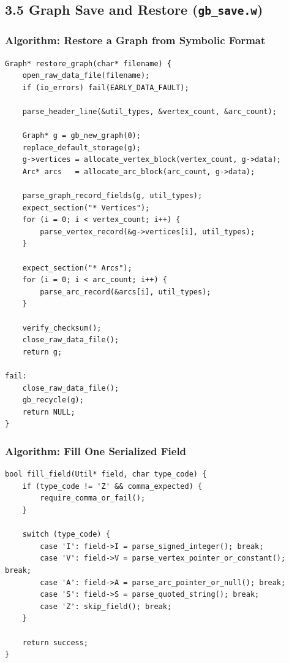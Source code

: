 \documentclass[11pt]{article}
\begin{document}
\subsection{\texorpdfstring{3.5 Graph Save and Restore (\texttt{gb\_save.w})}{3.5 Graph Save and Restore (gb\_save.w)}}\label{graph-save-and-restore-gb_save.w}

\subsubsection{Algorithm: Restore a Graph from Symbolic Format}\label{algorithm-restore-a-graph-from-symbolic-format}

\begin{verbatim}
Graph* restore_graph(char* filename) {
    open_raw_data_file(filename);
    if (io_errors) fail(EARLY_DATA_FAULT);

    parse_header_line(&util_types, &vertex_count, &arc_count);

    Graph* g = gb_new_graph(0);
    replace_default_storage(g);
    g->vertices = allocate_vertex_block(vertex_count, g->data);
    Arc* arcs   = allocate_arc_block(arc_count, g->data);

    parse_graph_record_fields(g, util_types);
    expect_section("* Vertices");
    for (i = 0; i < vertex_count; i++) {
        parse_vertex_record(&g->vertices[i], util_types);
    }

    expect_section("* Arcs");
    for (i = 0; i < arc_count; i++) {
        parse_arc_record(&arcs[i], util_types);
    }

    verify_checksum();
    close_raw_data_file();
    return g;

fail:
    close_raw_data_file();
    gb_recycle(g);
    return NULL;
}
\end{verbatim}

\subsubsection{Algorithm: Fill One Serialized Field}\label{algorithm-fill-one-serialized-field}

\begin{verbatim}
bool fill_field(Util* field, char type_code) {
    if (type_code != 'Z' && comma_expected) {
        require_comma_or_fail();
    }

    switch (type_code) {
        case 'I': field->I = parse_signed_integer(); break;
        case 'V': field->V = parse_vertex_pointer_or_constant(); break;
        case 'A': field->A = parse_arc_pointer_or_null(); break;
        case 'S': field->S = parse_quoted_string(); break;
        case 'Z': skip_field(); break;
    }

    return success;
}
\end{verbatim}
\end{document}
